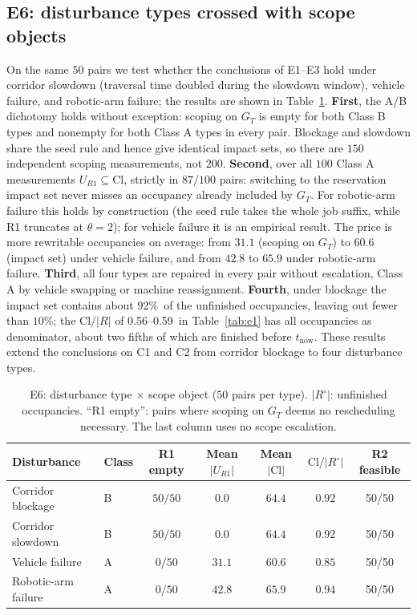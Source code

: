 \documentclass[manuscript,screen,review]{acmart}
\newcommand{\NPairs}{50}
\newcommand{\EoneCloLo}{0.56}
\newcommand{\EoneCloHi}{0.59}
\newcommand{\StrictlyLarger}{87/100}
\newcommand{\ClosureAliveFrac}{92\%}
\newcommand{\FeasESixBlock}{\NPairs/\NPairs}
\newcommand{\FeasSlow}{\NPairs/\NPairs}
\newcommand{\FeasESixAgv}{\NPairs/\NPairs}
\newcommand{\FeasESixRa}{\NPairs/\NPairs}
\begin{document}
\subsection{E6: disturbance types crossed with scope objects}
\label{sec:e6}

On the same \(\NPairs\) pairs we test whether the conclusions of E1--E3 hold under corridor slowdown (traversal time doubled during the slowdown window), vehicle failure, and robotic-arm failure; the results are shown in Table~\ref{tab:e6}.
\textbf{First}, the A/B dichotomy holds without exception: scoping on \(G_T\) is empty for both Class B types and nonempty for both Class A types in every pair.
Blockage and slowdown share the seed rule and hence give identical impact sets, so there are \(150\) independent scoping measurements, not \(200\).
\textbf{Second}, over all \(100\) Class A measurements \(U_{R1}\subseteq\mathrm{Cl}\), strictly in \(\StrictlyLarger\) pairs: switching to the reservation impact set never misses an occupancy already included by \(G_T\).
For robotic-arm failure this holds by construction (the seed rule takes the whole job suffix, while R1 truncates at \(\theta=2\)); for vehicle failure it is an empirical result.
The price is more rewritable occupancies on average: from \(31.1\) (scoping on \(G_T\)) to \(60.6\) (impact set) under vehicle failure, and from \(42.8\) to \(65.9\) under robotic-arm failure.
\textbf{Third}, all four types are repaired in every pair without escalation, Class A by vehicle swapping or machine reassignment.
\textbf{Fourth}, under blockage the impact set contains about \ClosureAliveFrac\ of the unfinished occupancies, leaving out fewer than \(10\%\); the \(\mathrm{Cl}/|R|\) of \EoneCloLo--\EoneCloHi\ in Table~\ref{tab:e1} has all occupancies as denominator, about two fifths of which are finished before \(t_{\mathrm{now}}\).
These results extend the conclusions on C1 and C2 from corridor blockage to four disturbance types.

\begin{table}[t]
\centering
\caption{E6: disturbance type \(\times\) scope object (\(\NPairs\) pairs per type). \(|R^{\circ}|\): unfinished occupancies. ``R1 empty'': pairs where scoping on \(G_T\) deems no rescheduling necessary.
The last column uses no scope escalation.}
\label{tab:e6}
\small
\begin{tabular}{@{}llccccc@{}}
\toprule
Disturbance & Class & R1 empty & Mean \(|U_{R1}|\) & Mean \(|\mathrm{Cl}|\) & \(\mathrm{Cl}/|R^{\circ}|\) & R2 feasible \\
\midrule
Corridor blockage   & B & \(50/50\) & \(0.0\)  & \(64.4\) & \(0.92\) & \FeasESixBlock \\
Corridor slowdown   & B & \(50/50\) & \(0.0\)  & \(64.4\) & \(0.92\) & \FeasSlow \\
Vehicle failure     & A & \(0/50\)  & \(31.1\) & \(60.6\) & \(0.85\) & \FeasESixAgv \\
Robotic-arm failure & A & \(0/50\)  & \(42.8\) & \(65.9\) & \(0.94\) & \FeasESixRa \\
\bottomrule
\end{tabular}
\end{table}
\end{document}
